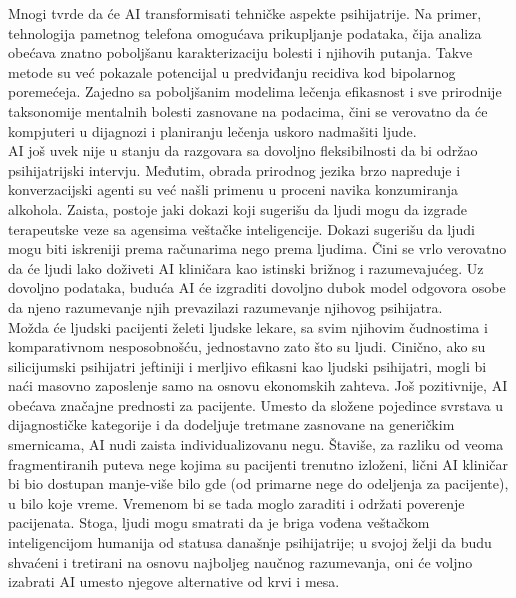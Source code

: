 \documentclass[a4paper]{article}
\begin{document}
Mnogi tvrde da će AI transformisati tehničke aspekte psihijatrije. Na primer, tehnologija pametnog telefona omogućava prikupljanje podataka, čija analiza obećava znatno poboljšanu karakterizaciju bolesti i njihovih putanja. Takve metode su već pokazale potencijal u predviđanju recidiva kod bipolarnog poremećeja. Zajedno sa poboljšanim modelima lečenja efikasnost i sve prirodnije taksonomije mentalnih bolesti zasnovane na podacima, čini se verovatno da će kompjuteri u dijagnozi i planiranju lečenja uskoro nadmašiti ljude.\\
AI još uvek nije u stanju da razgovara sa dovoljno fleksibilnosti da bi održao psihijatrijski intervju. Međutim, obrada prirodnog jezika brzo napreduje i konverzacijski agenti su već našli primenu u proceni navika konzumiranja alkohola. Zaista, postoje jaki dokazi koji sugerišu da ljudi mogu da izgrade terapeutske veze sa agensima veštačke inteligencije. Dokazi sugerišu da ljudi mogu biti iskreniji prema računarima nego prema ljudima. Čini se vrlo verovatno da će ljudi lako doživeti AI kliničara kao istinski brižnog i razumevajućeg. Uz dovoljno podataka, buduća AI će izgraditi dovoljno dubok model odgovora osobe da njeno razumevanje njih prevazilazi razumevanje njihovog psihijatra.\\
Možda će ljudski pacijenti želeti ljudske lekare, sa svim njihovim čudnostima i komparativnom nesposobnošću, jednostavno zato što su ljudi. Cinično, ako su silicijumski psihijatri jeftiniji i merljivo efikasni kao ljudski psihijatri, mogli bi naći masovno zaposlenje samo na osnovu ekonomskih zahteva. Još pozitivnije, AI obećava značajne prednosti za pacijente. Umesto da složene pojedince svrstava u dijagnostičke kategorije i da dodeljuje tretmane zasnovane na generičkim smernicama, AI nudi zaista individualizovanu negu. Štaviše, za razliku od veoma fragmentiranih puteva nege kojima su pacijenti trenutno izloženi, lični AI kliničar bi bio dostupan manje-više bilo gde (od primarne nege do odeljenja za pacijente), u bilo koje vreme. Vremenom bi se tada moglo zaraditi i održati poverenje pacijenata. Stoga, ljudi mogu smatrati da je briga vođena veštačkom inteligencijom humanija od statusa današnje psihijatrije; u svojoj želji da budu shvaćeni i tretirani na osnovu najboljeg naučnog razumevanja, oni će voljno izabrati AI umesto njegove alternative od krvi i mesa.


\newpage
\end{document}

